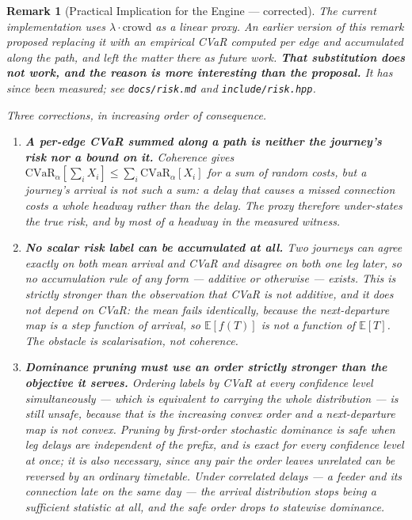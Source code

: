 \documentclass[11pt, a4paper]{article}
\newtheorem{remark}[theorem]{Remark}
\theoremstyle{remark}
\newcommand{\crowd}{\mathrm{crowd}}
\newcommand{\CVaR}{\mathrm{CVaR}}
\newcommand{\E}{\mathbb{E}}
\begin{document}
\begin{remark}[Practical Implication for the Engine --- corrected]
    The current implementation uses $\lambda \cdot \crowd$ as a linear proxy.
    An earlier version of this remark proposed replacing it with an empirical
    CVaR computed per edge and accumulated along the path, and left the matter
    there as future work. \textbf{That substitution does not work, and the
    reason is more interesting than the proposal.} It has since been measured;
    see \texttt{docs/risk.md} and \texttt{include/risk.hpp}.

    Three corrections, in increasing order of consequence.

    \begin{enumerate}
        \item \textbf{A per-edge CVaR summed along a path is neither the
              journey's risk nor a bound on it.} Coherence gives
              $\CVaR_\alpha[\sum_i X_i] \le \sum_i \CVaR_\alpha[X_i]$ for a sum
              of random costs, but a journey's arrival is not such a sum: a
              delay that causes a \emph{missed connection} costs a whole
              headway rather than the delay. The proxy therefore under-states
              the true risk, and by most of a headway in the measured witness.

        \item \textbf{No scalar risk label can be accumulated at all.} Two
              journeys can agree exactly on both mean arrival and CVaR and
              disagree on both one leg later, so no accumulation rule of any
              form --- additive or otherwise --- exists. This is strictly
              stronger than the observation that CVaR is not additive, and it
              does not depend on CVaR: the mean fails identically, because the
              next-departure map is a step function of arrival, so
              $\E[f(T)]$ is not a function of $\E[T]$. The obstacle is
              \emph{scalarisation}, not coherence.

        \item \textbf{Dominance pruning must use an order strictly stronger
              than the objective it serves.} Ordering labels by CVaR at every
              confidence level simultaneously --- which is equivalent to
              carrying the whole distribution --- is still unsafe, because that
              is the increasing convex order and a next-departure map is not
              convex. Pruning by \emph{first-order stochastic dominance} is
              safe when leg delays are independent of the prefix, and is exact
              for every confidence level at once; it is also necessary, since
              any pair the order leaves unrelated can be reversed by an ordinary
              timetable. Under correlated delays --- a feeder and its connection
              late on the same day --- the arrival distribution stops being a
              sufficient statistic at all, and the safe order drops to
              statewise dominance.
    \end{enumerate}


\end{remark}
\end{document}
